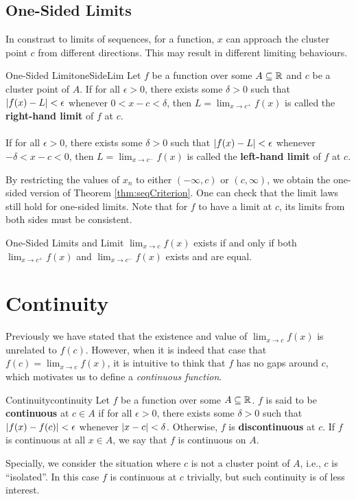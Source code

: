\documentclass[math]{amznotes}
\theoremstyle{remark}
\begin{document}
\subsection{One-Sided Limits}
In constrast to limits of sequences, for a function, $x$ can approach the cluster point $c$ from different directions. This may result in different limiting behaviours.
\begin{dfnbox}{One-Sided Limit}{oneSideLim}
    Let $f$ be a function over some $A \subseteq \mathbb{R}$ and $c$ be a cluster point of $A$. If for all $\epsilon > 0$, there exists some $\delta > 0$ such that ${\left\lvert {f(x) - L} \right\rvert} < \epsilon$ whenever $0 < x - c < \delta$, then $L = \lim_{x \to c^+}f(x)$ is called the {\color{red} \textbf{right-hand limit}} of $f$ at $c$.
    \\\\
    If for all $\epsilon > 0$, there exists some $\delta > 0$ such that ${\left\lvert {f(x) - L} \right\rvert} < \epsilon$ whenever $-\delta < x - c < 0$, then $L = \lim_{x \to c^-}f(x)$ is called the {\color{red} \textbf{left-hand limit}} of $f$ at $c$.
\end{dfnbox}
By restricting the values of $x_n$ to either $(-\infty, c)$ or $(c, \infty)$, we obtain the one-sided version of Theorem \ref{thm:seqCriterion}. One can check that the limit laws still hold for one-sided limits. Note that for $f$ to have a limit at $c$, its limits from both sides must be consistent.
\begin{thmbox}{One-Sided Limits and Limit}{}
    $\lim_{x \to c}f(x)$ exists if and only if both $\lim_{x \to c^+}f(x)$ and $\lim_{x \to c^-}f(x)$ exists and are equal.
\end{thmbox}
\section{Continuity}
Previously we have stated that the existence and value of $\lim_{x \to c}f(x)$ is unrelated to $f(c)$. However, when it is indeed that case that $f(c) = \lim_{x \to c}f(x)$, it is intuitive to think that $f$ has no gaps around $c$, which motivates us to define a \textit{continuous function}.
\begin{dfnbox}{Continuity}{continuity}
    Let $f$ be a function over some $A \subseteq \mathbb{R}$. $f$ is said to be {\color{red} \textbf{continuous}} at $c \in A$ if for all $\epsilon > 0$, there exists some $\delta > 0$ such that ${\left\lvert {f(x) - f(c)} \right\rvert} < \epsilon$ whenever ${\left\lvert {x - c} \right\rvert} < \delta$. Otherwise, $f$ is {\color{red} \textbf{discontinuous}} at $c$. If $f$ is continuous at all $x \in A$, we say that $f$ is continuous on $A$.
\end{dfnbox}
Specially, we consider the situation where $c$ is not a cluster point of $A$, i.e., $c$ is ``isolated''. In this case $f$ is continuous at $c$ trivially, but such continuity is of less interest.
\end{document}
